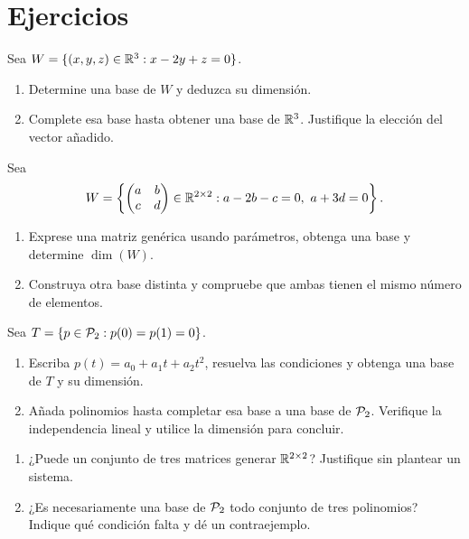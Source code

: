 \documentclass[compacto,10pt]{pubciencias-notas}
\begin{document}
\section{Ejercicios}

\begin{ejer}
    Sea $W=\{(x,y,z)\in\R^3:x-2y+z=0\}$.
    \begin{enumerate}
        \item Determine una base de $W$ y deduzca su dimensión.
        \item Complete esa base hasta obtener una base de $\R^3$.
              Justifique la elección del vector añadido.
    \end{enumerate}
\end{ejer}

\begin{ejer}
    Sea
    \[
        W=\left\{\begin{pmatrix}a&b\\c&d\end{pmatrix}
        \in\Mat[\R]{2}{2}:a-2b-c=0,\ a+3d=0\right\}.
    \]
    \begin{enumerate}
        \item Exprese una matriz genérica usando parámetros, obtenga una
              base y determine $\dim(W)$.
        \item Construya otra base distinta y compruebe que ambas tienen
              el mismo número de elementos.
    \end{enumerate}
\end{ejer}

\begin{ejer}
    Sea $T=\{p\in\Pol_2:p(0)=p(1)=0\}$.
    \begin{enumerate}
        \item Escriba $p(t)=a_0+a_1t+a_2t^2$, resuelva las condiciones
              y obtenga una base de $T$ y su dimensión.
        \item Añada polinomios hasta completar esa base a una base de
              $\Pol_2$. Verifique la independencia lineal y utilice la
              dimensión para concluir.
    \end{enumerate}
\end{ejer}

\begin{ejer}
    \begin{enumerate}
        \item ¿Puede un conjunto de tres matrices generar
              $\Mat[\R]{2}{2}$? Justifique sin plantear un sistema.
        \item ¿Es necesariamente una base de $\Pol_2$ todo conjunto de
              tres polinomios? Indique qué condición falta y dé un contraejemplo.
    \end{enumerate}
\end{ejer}
\end{document}
